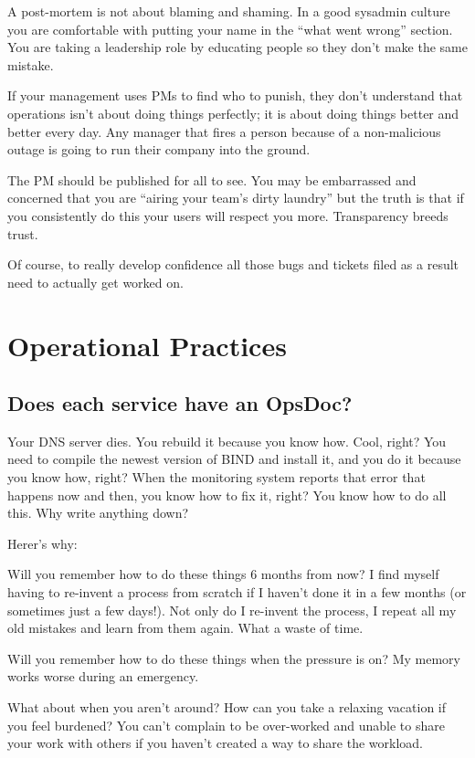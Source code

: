 \documentclass{article}
\begin{document}
A post-mortem is not about blaming and shaming. In a good sysadmin culture you are comfortable with putting your name in the ``what went wrong'' section. You are taking a leadership role by educating people so they don't make the same mistake.

If your management uses PMs to find who to punish, they don't understand that operations isn't about doing things perfectly; it is about doing things better and better every day. Any manager that fires a person because of a non-malicious outage is going to run their company into the ground.

The PM should be published for all to see. You may be embarrassed and concerned that you are ``airing your team's dirty laundry'' but the truth is that if you consistently do this your users will respect you more. Transparency breeds trust.

Of course, to really develop confidence all those bugs and tickets filed as a result need to actually get worked on.

\section{Operational Practices}
\subsection{Does each service have an OpsDoc?}
Your DNS server dies. You rebuild it because you know how. Cool, right? You need to compile the newest version of BIND and install it, and you do it because you know how, right? When the monitoring system reports that error that happens now and then, you know how to fix it, right? You know how to do all this. Why write anything down?

Herer's why:

Will you remember how to do these things 6 months from now? I find myself having to re-invent a process from scratch if I haven't done it in a few months (or sometimes just a few days!). Not only do I re-invent the process, I repeat all my old mistakes and learn from them again. What a waste of time.

Will you remember how to do these things when the pressure is on? My memory works worse during an emergency.

What about when you aren't around? How can you take a relaxing vacation if you feel burdened? You can't complain to be over-worked and unable to share your work with others if you haven't created a way to share the workload.
\end{document}
